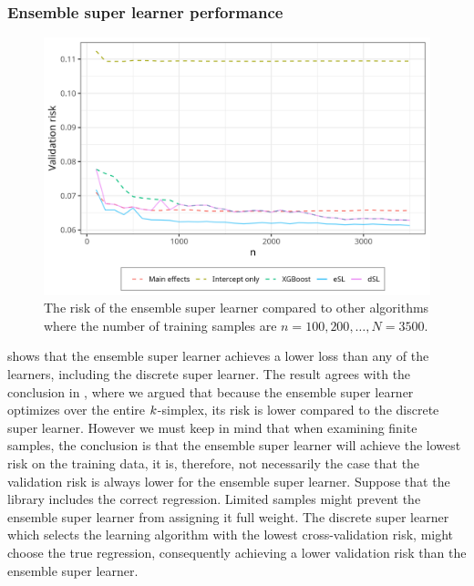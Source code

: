 \documentclass[./main.tex]{subfiles}
\begin{document}
\subsubsection{Ensemble super learner performance}
\begin{figure}[H]
    \centering
    \includegraphics[width=\textwidth]{figures/losses_esl_s23.png}
    \caption{The risk of the ensemble super learner compared to other algorithms where the number of training samples are $n = 100, 200, \dots , N = 3500 $.}
    \label{fig:losses_esl_s23}
\end{figure}
 shows that the ensemble super learner achieves a lower loss than any of the learners, including the discrete super learner. The result agrees with the conclusion in , where we argued that because the ensemble super learner optimizes over the entire $ k $-simplex, its risk is lower compared to the discrete super learner. However we must keep in mind that when examining finite samples, the conclusion is that the ensemble super learner will achieve the lowest risk on the training data, it is, therefore, not necessarily the case that the validation risk is always lower for the ensemble super learner. Suppose that the library includes the correct regression. Limited samples might prevent the ensemble super learner from assigning it full weight. The discrete super learner which selects the learning algorithm with the lowest cross-validation risk, might choose the true regression, consequently achieving a lower validation risk than the ensemble super learner.
\end{document}
